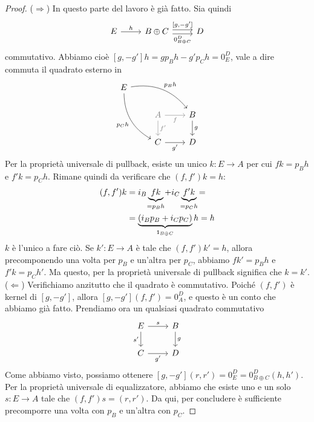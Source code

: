 \begin{proof}
  (\(\Rightarrow\)) In questo parte del lavoro è già fatto. Sia quindi
  \[
    \begin{tikzcd}
      E \ar["{h}", r] & B \oplus C \ar["{[g, -g']}", r, shift left]
      \ar["{0_{B \oplus C}^D}", r, shift right, swap] & D
    \end{tikzcd}
  \]
  commutativo. Abbiamo cioè \([g, -g'] h = g p_B h - g' p_C h = 0_E^D\),
  vale a dire commuta il quadrato esterno in
  \[
    \begin{tikzcd}
      E \ar["{p_B h}", drr, bend left] \ar["{p_C h}", ddr, swap,
      bend right] \\
      & {\color{gray} A} \ar["{f}" gray, gray, r, swap] \ar["{f'}" gray, gray, d] & B \ar["{g}", d] \\
      & C \ar["{g'}", r, swap] & D
    \end{tikzcd}
  \]
  Per la proprietà universale di pullback, esiste un unico
  \(k : E \to A\) per cui \(f k = p_B h\) e \(f' k = p_C h\). Rimane
  quindi da verificare che \((f, f') k = h\):
  \begin{align*}
    (f, f') k &= i_B \underbrace{f k}_{\crampedclap{=p_B h}} + i_C \underbrace{f' k}_{\crampedclap{=p_C h}} = \\
              &= \underbrace{(i_B p_B + i_C p_C)}_{\id_{B \oplus C}} h = h
  \end{align*}
  \(k\) è l'unico a fare ciò. Se \(k' : E \to A\) è tale che
  \((f, f') k' = h\), allora precomponendo una volta per \(p_B\) e
  un'altra per \(p_C\), abbiamo \(f k' = p_B h\) e \(f' k = p_C h'\). Ma
  questo, per la proprietà universale di pullback significa che
  \(k = k'\).\newline
  (\(\Leftarrow\)) Verifichiamo anzitutto che il quadrato è
  commutativo. Poiché \((f, f')\) è kernel di \([g, -g']\), allora
  \([g, -g'] (f, f') = 0_A^D\), e questo è un conto che abbiamo già
  fatto. Prendiamo ora un qualsiasi quadrato commutativo
  \[
    \begin{tikzcd}
      E \ar["{s}", r] \ar["{s'}", d, swap] & B \ar["{g}", d] \\
      C \ar["{g'}", r, swap] & D
    \end{tikzcd}
  \]
  Come abbiamo visto, possiamo ottenere
  \([g, -g'] (r, r') = 0_E^D = 0_{B \oplus C}^D (h, h')\). Per la
  proprietà universale di equalizzatore, abbiamo che esiste uno e un
  solo \(s : E \to A\) tale che \((f, f') s = (r, r')\). Da qui, per
  concludere è sufficiente precomporre una volta con \(p_B\) e un'altra
  con \(p_C\). %
\end{proof}


